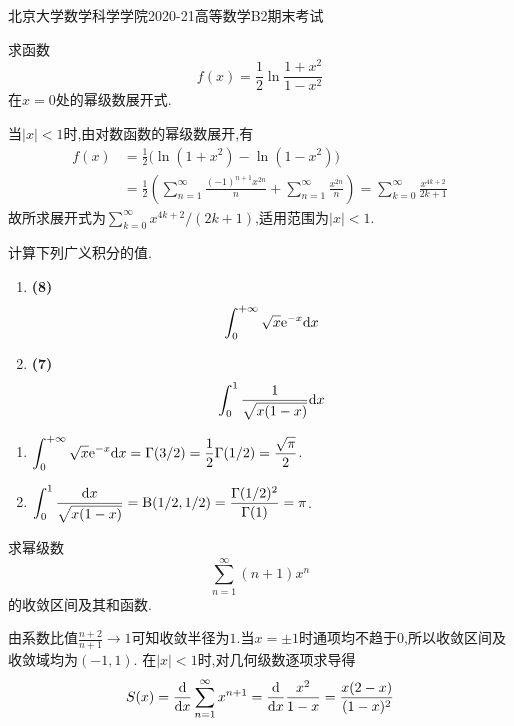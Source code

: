 \documentclass{ctexart}
\begin{document}
\pagestyle{empty}
\begin{center}\Large
    北京大学数学科学学院2020-21高等数学B2期末考试
\end{center}
\begin{problem}[1.(15\songti{分})]
求函数
        \[f(x)=\dfrac12\ln\dfrac{1+x^2}{1-x^2}\]
        在$x=0$处的幂级数展开式.
\end{problem}
\begin{solution}
当$|x|<1$时,由对数函数的幂级数展开,有
\[\begin{aligned}
f(x)&=\frac12\bigl(\ln(1+x^2)-\ln(1-x^2)\bigr)\\
&=\frac12\left(\sum_{n=1}^{\infty}\frac{(-1)^{n+1}x^{2n}}n+
\sum_{n=1}^{\infty}\frac{x^{2n}}n\right)
=\sum_{k=0}^{\infty}\frac{x^{4k+2}}{2k+1}
\end{aligned}\]
故所求展开式为$\displaystyle\sum_{k=0}^{\infty}x^{4k+2}/(2k+1)$,适用范围为$|x|<1$.
\end{solution}

\begin{problem}[2.(15\songti{分})]
计算下列广义积分的值.
        \begin{enumerate}[label=\tbf{(\arabic*)},topsep=0pt,parsep=0pt,itemsep=0pt,partopsep=0pt]
            \item \textbf{(8)}
                \[\int_0^{+\infty}\sqrt{x}\mathrm{e}^{-x}\mathrm{d} x\]
            \item \textbf{(7)}\ 
                \[\int_0^1\dfrac{1}{\sqrt{x(1-x)}}\mathrm{d} x\]
        \end{enumerate}
\end{problem}
\begin{solution}
\begin{enumerate}[label=\tbf{(\arabic*)},topsep=0pt,parsep=0pt,itemsep=0pt,partopsep=0pt]
\item $\displaystyle\int_0^{+\infty}\sqrt x\mathrm{e}^{-x}\mathrm{d} x
=\Gamma(3/2)=\frac12\Gamma(1/2)=\frac{\sqrt\pi}{2}$.
\item $\displaystyle\int_0^1\frac{\mathrm{d} x}{\sqrt{x(1-x)}}
=\mathrm B(1/2,1/2)=\frac{\Gamma(1/2)^2}{\Gamma(1)}=\pi$.
\end{enumerate}
\end{solution}

\begin{problem}[3.(15\songti{分})]
求幂级数
        \[\sum_{n=1}^{\infty}(n+1)x^n\]
        的收敛区间及其和函数.
\end{problem}
\begin{solution}
由系数比值$\displaystyle\frac{n+2}{n+1}\to1$可知收敛半径为$1$.当$x=\pm1$时通项均不趋于$0$,所以收敛区间及收敛域均为$(-1,1)$.
在$|x|<1$时,对几何级数逐项求导得
\[S(x)=\frac{\mathrm{d}}{\mathrm{d} x}\sum_{n=1}^{\infty}x^{n+1}
=\frac{\mathrm{d}}{\mathrm{d} x}\frac{x^2}{1-x}=\frac{x(2-x)}{(1-x)^2}\]
\end{solution}
\end{document}
